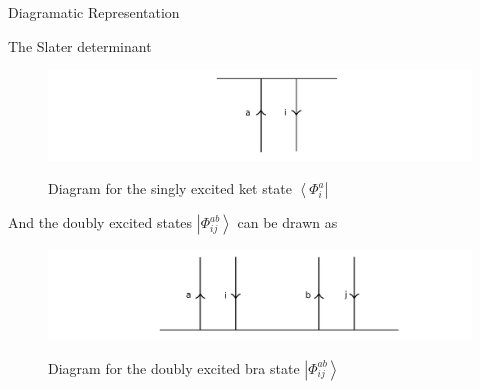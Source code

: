 \documentclass[twoside,english]{uiofysmaster}
\begin{document}
\begin{chapter}{Diagramatic Representation}
\begin{section}{The Slater determinant}
		\begin{figure}[H]
			\includegraphics[width=\textwidth]{Figures/SlaterDeterminant3.pdf}
			\label{Slaterdeterminant3}
			\caption{Diagram for the singly excited ket state $\left< \Phi_i^a \right|$}
		\end{figure}
		And the doubly excited states $\left| \Phi_{ij}^{ab} \right>$ can be drawn as
		\begin{figure}[H]
			\includegraphics[width=\textwidth]{Figures/SlaterDeterminant4.pdf}
			\label{Slaterdeterminant4}
			\caption{Diagram for the doubly excited bra state $\left| \Phi_{ij}^{ab} \right>$}
		\end{figure}
	\end{section}


\end{chapter}
\end{document}
